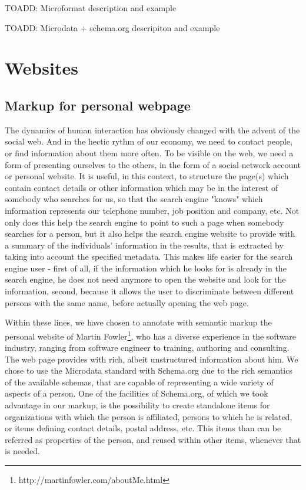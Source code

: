 \documentclass{acm_proc_10ptArticle-sp}
\begin{document}
TOADD: Microformat description and example

TOADD: Microdata + schema.org descripiton and example

\section{Websites}

\subsection{Markup for personal webpage}

The dynamics of human interaction has obviously changed with the advent of the social web. And in the hectic rythm of our economy, we need to contact people, or find information about them more often. To be visible on the web, we need a form of presenting ourselves to the others, in the form of a social network account or personal website. It is useful, in this context, to structure the page(s) which contain contact details or other information which may be in the interest of somebody who searches for us, so that the search engine "knows" which information represents our telephone number, job position and company, etc. Not only does this help the search engine to point to such a page when somebody searches for a person, but it also helps the search engine website to provide with a summary of the individuals' information in the results, that is extracted by taking into account the specified metadata. This makes life easier for the search engine user - first of all, if the information which he looks for is already in the search engine, he does not need anymore to open the website and look for the information, second, because it allows the user to discriminate between different persons with the same name, before actually opening the web page. 

Within these lines, we have chosen to annotate with semantic markup the personal website of Martin Fowler\footnote{http://martinfowler.com/aboutMe.html}, who has a diverse experience in the software industry, ranging from software engineer to training, authoring and consulting.  The web page provides with rich, albeit unstructured information about him. We chose to use the Microdata standard with Schema.org due to the rich semantics of the available schemas, that are capable of representing a wide variety of aspects of a person. One of the facilities of Schema.org, of which we took advantage in our markup, is the possibility to create standalone items for organizations with which the person is affiliated, persons to which he is related, or items defining contact details, postal address, etc. This items than can be referred as properties of the person, and reused within other items, whenever that is needed. 
\end{document}
